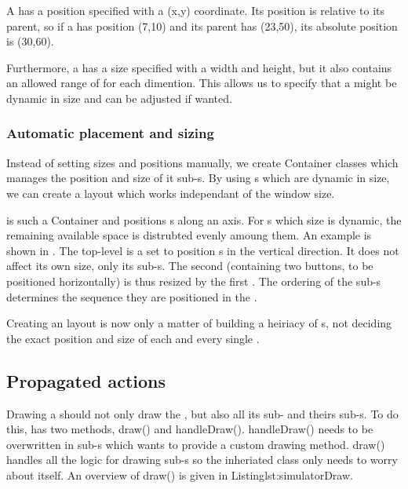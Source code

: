 A  has a position specified with a (x,y) coordinate. Its position is relative to its parent, so if a  has position (7,10) and its parent has (23,50), its absolute position is (30,60).

Furthermore, a  has a size specified with a width and height, but it also contains an allowed range of for each dimention. This allows us to specify that a  might be dynamic in size and can be adjusted if wanted.


\subsubsection{Automatic placement and sizing}

Instead of setting sizes and positions manually, we create Container classes which manages the position and size of it sub-s. By using s which are dynamic in size, we can create a layout which works independant of the window size.

 is such a Container  and positions s along an axis. For s which size is dynamic, the remaining available space is distrubted evenly amoung them. An example is shown in . The top-level  is a  set to position s in the vertical direction. It does not affect its own size, only its sub-s. The second  (containing two buttons, to be positioned horizontally) is thus resized by the first . The ordering of the sub-s determines the sequence they are positioned in the .


Creating an layout is now only a matter of building a heiriacy of s, not deciding the exact position and size of each and every single .


\subsection{Propagated actions}

Drawing a  should not only draw the , but also all its sub- and theirs sub-s. To do this,  has two methods, draw() and handleDraw(). handleDraw() needs to be overwritten in sub-s which wants to provide a custom drawing method. draw() handles all the logic for drawing sub-s so the inheriated class only needs to worry about itself. An overview of draw() is given in Listing{lst:simulatorDraw}.

